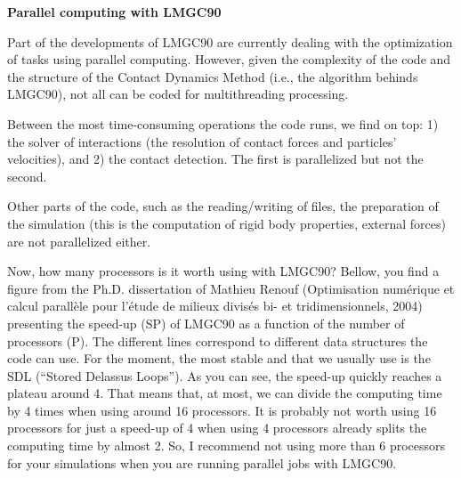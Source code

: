 \documentclass[12pt]{article}
\begin{document}
\begin{center}
  \textbf{\Large Parallel computing with LMGC90}\\
\end{center}

Part of the developments of LMGC90 are currently dealing with the optimization of tasks using parallel computing. However, given the complexity of the code and the structure of the Contact Dynamics Method (i.e., the algorithm behinds LMGC90), not all can be coded for multithreading processing. 

Between the most time-consuming operations the code runs, we find on top: 1) the solver of interactions (the resolution of contact forces and particles’ velocities), and 2) the contact detection. The first is parallelized but not the second.

Other parts of the code, such as the reading/writing of files, the preparation of the simulation (this is the computation of rigid body properties, external forces) are not parallelized either. 

Now, how many processors is it worth using with LMGC90? Bellow, you find a figure from the Ph.D. dissertation of Mathieu Renouf (Optimisation numérique et calcul parallèle pour l’étude de milieux divisés bi- et tridimensionnels, 2004) presenting the speed-up (SP) of LMGC90 as a function of the number of processors (P). The different lines correspond to different data structures the code can use. For the moment, the most stable and that we usually use is the SDL (“Stored Delassus Loops”). As you can see, the speed-up quickly reaches a plateau around 4. That means that, at most, we can divide the computing time by 4 times when using around 16 processors. It is probably not worth using 16 processors for just a speed-up of 4 when using 4 processors already splits the computing time by almost 2. So, I recommend not using more than 6 processors for your simulations when you are running parallel jobs with LMGC90. 
\end{document}
